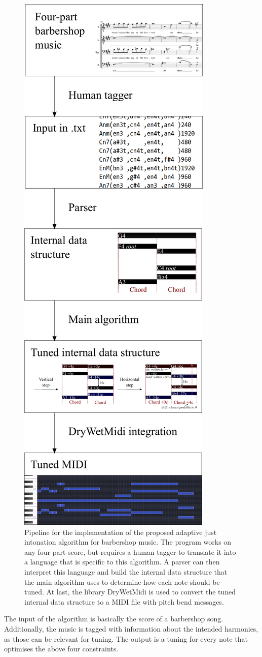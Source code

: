 \documentclass[a4paper]{article}
\begin{document}
\begin{figure}
	\centering
	\includegraphics[width=0.5\linewidth]{Figures/pipeline.pdf}
	\caption{Pipeline for the implementation of the proposed adaptive just intonation algorithm for barbershop music. The program works on any four-part score, but requires a human tagger to translate it into a language that is specific to this algorithm. A parser can then interpret this language and build the internal data structure that the main algorithm uses to determine how each note should be tuned. At last, the library DryWetMidi is used to convert the tuned internal data structure to a MIDI file with pitch bend messages.}
	\label{fig:pipeline}
\end{figure}

The input of the algorithm is basically the score of a barbershop song. Additionally, the music is tagged with information about the intended harmonies, as those can be relevant for tuning. The output is a tuning for every note that optimises the above four constraints.
\end{document}
